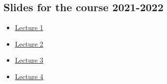 \documentclass[ 12pt]{article}
\begin{document}
\subsection{Slides for the course 2021-2022}

\begin{itemize}
\item[]  
  \href{http://mery54.github.io/teaching/mosos/lecturesnotes/2021-22-MLS-00.pdf}{Lecture
    1 }
\item[]  
  \href{http://mery54.github.io/teaching/mosos/lecturesnotes/2021-22-MLS-01.pdf}{Lecture
    2 }
  \item[]  
  \href{http://mery54.github.io/teaching/mosos/lecturesnotes/2021-22-MLS-02.pdf}{Lecture
    3 }
  \item[]  
  \href{http://mery54.github.io/teaching/mosos/lecturesnotes/2021-22-MLS-03.pdf}{Lecture 4 }
\end{itemize}





\end{document}
